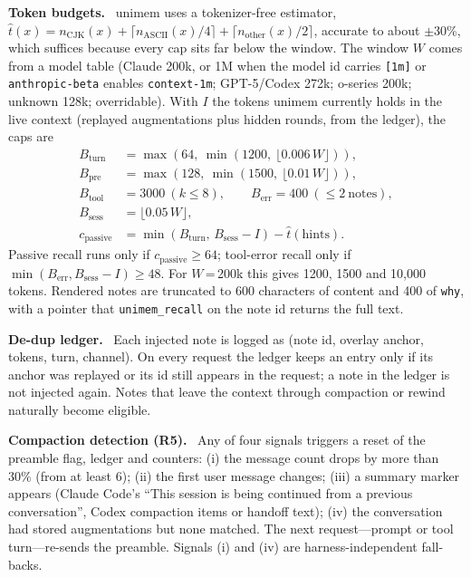 \documentclass[10pt,twocolumn]{article}
\newcommand{\sys}{\textsf{unimem}}
\newcommand{\code}[1]{\texttt{\small #1}}
\newcommand{\para}[1]{\smallskip\noindent\textbf{#1}\ }
\begin{document}
\para{Token budgets.} \sys{} uses a tokenizer-free estimator,
$\hat t(x)=n_{\text{CJK}}(x)+\lceil n_{\text{ASCII}}(x)/4\rceil+\lceil n_{\text{other}}(x)/2\rceil$, accurate to about
$\pm$30\%, which suffices because every cap sits far below the window. The window $W$ comes from a model table (Claude
200k, or 1M when the model id carries \code{[1m]} or \code{anthropic-beta} enables \code{context-1m}; GPT-5/Codex 272k;
o-series 200k; unknown 128k; overridable). With $I$ the tokens \sys{} currently holds in the live context (replayed
augmentations plus hidden rounds, from the ledger), the caps are
\begin{align*}
B_{\text{turn}} &= \max(64,\ \min(1200,\ \lfloor 0.006\,W\rfloor)),\\
B_{\text{pre}} &= \max(128,\ \min(1500,\ \lfloor 0.01\,W\rfloor)),\\
B_{\text{tool}} &= 3000\ (k\le 8),\qquad B_{\text{err}} = 400\ (\le 2\ \text{notes}),\\
B_{\text{sess}} &= \lfloor 0.05\,W\rfloor,\\
c_{\text{passive}} &= \min(B_{\text{turn}},\, B_{\text{sess}}-I) - \hat t(\text{hints}).
\end{align*}
Passive recall runs only if $c_{\text{passive}}\ge 64$; tool-error recall only if $\min(B_{\text{err}}, B_{\text{sess}}-I)\ge 48$.
For $W$\,=\,200k this gives 1200, 1500 and 10,000 tokens. Rendered notes are truncated to 600 characters of content
and 400 of \code{why}, with a pointer that \code{unimem\_recall} on the note id returns the full text.

\para{De-dup ledger.} Each injected note is logged as (note id, overlay anchor, tokens, turn, channel). On every request
the ledger keeps an entry only if its anchor was replayed or its id still appears in the request; a note in the
ledger is not injected again. Notes that leave the context through compaction or rewind naturally become eligible.

\para{Compaction detection (R5).} Any of four signals triggers a reset of the preamble flag, ledger and counters:
(i) the message count drops by more than 30\% (from at least 6);
(ii) the first user message changes;
(iii) a summary marker appears (Claude Code's ``This session is being continued from a previous conversation'',
Codex compaction items or handoff text);
(iv) the conversation had stored augmentations but none matched.
The next request---prompt or tool turn---re-sends the preamble. Signals (i) and (iv) are harness-independent fall-backs.
\end{document}

